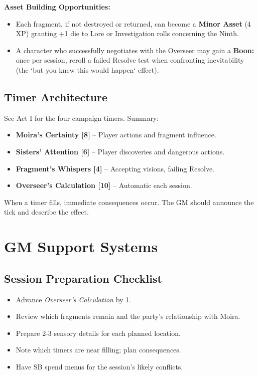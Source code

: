 \documentclass[11pt]{article}
\begin{document}
\textbf{Asset Building Opportunities:}
\begin{itemize}
    \item Each fragment, if not destroyed or returned, can become a \textbf{Minor Asset} (4 XP) granting +1 die to Lore or Investigation rolls concerning the Ninth.
    \item A character who successfully negotiates with the Overseer may gain a \textbf{Boon:} once per session, reroll a failed Resolve test when confronting inevitability (the `but you knew this would happen` effect).
\end{itemize}

\subsection{Timer Architecture}

See Act I for the four campaign timers. Summary:

\begin{itemize}
    \item \textbf{Moira's Certainty [8]} -- Player actions and fragment influence.
    \item \textbf{Sisters' Attention [6]} -- Player discoveries and dangerous actions.
    \item \textbf{Fragment's Whispers [4]} -- Accepting visions, failing Resolve.
    \item \textbf{Overseer's Calculation [10]} -- Automatic each session.
\end{itemize}

When a timer fills, immediate consequences occur. The GM should announce the tick and describe the effect.

\section{GM Support Systems}

\subsection{Session Preparation Checklist}
\begin{itemize}
    \item[$\square$] Advance \textit{Overseer's Calculation} by 1.
    \item[$\square$] Review which fragments remain and the party's relationship with Moira.
    \item[$\square$] Prepare 2-3 sensory details for each planned location.
    \item[$\square$] Note which timers are near filling; plan consequences.
    \item[$\square$] Have SB spend menus for the session's likely conflicts.
\end{itemize}
\end{document}
